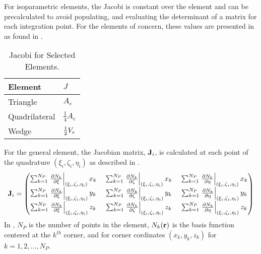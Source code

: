     For isoparametric elements, the Jacobi is constant over the element and can
    be precalculated to avoid populating, and evaluating the 
    determinant of a matrix for each integration point. For the elements of 
    concern, these values are presented in  as found in 
    \cite{textbookcolorado}.
    \begin{table}
      \caption{Jacobi for Selected Elements.}
      \label{tab:jacobi}
      \begin{center}
        \begin{tabular}{ll}
          \toprule
          Element & $J$ \\
          \midrule
          Triangle      & $A_e$ \\
          Quadrilateral & $\frac{1}{4} A_e$ \\
          Wedge         & $\frac{1}{2} V_e$ \\
          \bottomrule
        \end{tabular}
      \end{center}
    \end{table}

    For the general element, the Jacobian matrix, $\mathbf{J}_i$, is calculated at each
    point of the quadrature $(\xi_i,\zeta_i,\eta_i)$ as described in
    .
    \begin{equation}
      \label{eq:calcJacobian}
      \mathbf{J}_i = 
      \begin{pmatrix}
        \sum_{k=1}^{N_P} \left. \frac{\partial N_k}{\partial \xi}
          \right|_{(\xi_i,\zeta_i,\eta_i)} x_k   \; &
        \sum_{k=1}^{N_P} \left. \frac{\partial N_k}{\partial \zeta}
          \right|_{(\xi_i,\zeta_i,\eta_i)} x_k   \; &
        \sum_{k=1}^{N_P} \left. \frac{\partial N_k}{\partial \eta} 
          \right|_{(\xi_i,\zeta_i,\eta_i)} x_k   \\
        \sum_{k=1}^{N_P} \left. \frac{\partial N_k}{\partial \xi}
          \right|_{(\xi_i,\zeta_i,\eta_i)} y_k   \; &
        \sum_{k=1}^{N_P} \left. \frac{\partial N_k}{\partial \zeta} 
          \right|_{(\xi_i,\zeta_i,\eta_i)} y_k   \; &
        \sum_{k=1}^{N_P} \left. \frac{\partial N_k}{\partial \eta} 
          \right|_{(\xi_i,\zeta_i,\eta_i)} y_k   \\
        \sum_{k=1}^{N_P} \left. \frac{\partial N_k}{\partial \xi}
          \right|_{(\xi_i,\zeta_i,\eta_i)} z_k   \; &
        \sum_{k=1}^{N_P} \left. \frac{\partial N_k}{\partial \zeta} 
          \right|_{(\xi_i,\zeta_i,\eta_i)} z_k   \; &
        \sum_{k=1}^{N_P} \left. \frac{\partial N_k}{\partial \eta} 
          \right|_{(\xi_i,\zeta_i,\eta_i)} z_k   
      \end{pmatrix}
    \end{equation}
    In , $N_P$ is the number of points in the element, 
    $N_k(\mathbf{r})$ is the basis function centered at the $k^{th}$ corner, and 
    for corner cordinates $(x_k,y_k,z_k)$ for $k = 1,2,\ldots,N_P$.

